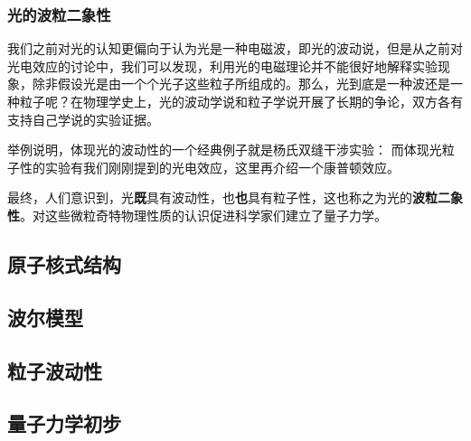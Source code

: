 \subsubsection{光的波粒二象性}
我们之前对光的认知更偏向于认为光是一种电磁波，即光的波动说，但是从之前对光电效应的讨论中，我们可以发现，利用光的电磁理论并不能很好地解释实验现象，除非假设光是由一个个光子这些粒子所组成的。那么，光到底是一种波还是一种粒子呢？在物理学史上，光的波动学说和粒子学说开展了长期的争论，双方各有支持自己学说的实验证据。

举例说明，体现光的波动性的一个经典例子就是杨氏双缝干涉实验：
而体现光粒子性的实验有我们刚刚提到的光电效应，这里再介绍一个康普顿效应。

最终，人们意识到，光\textbf{既}具有波动性，也\textbf{也}具有粒子性，这也称之为光的\textbf{波粒二象性}。对这些微粒奇特物理性质的认识促进科学家们建立了量子力学。
\subsection{原子核式结构}

\subsection{波尔模型}
\subsection{粒子波动性}
\subsection{量子力学初步}

% 
% 